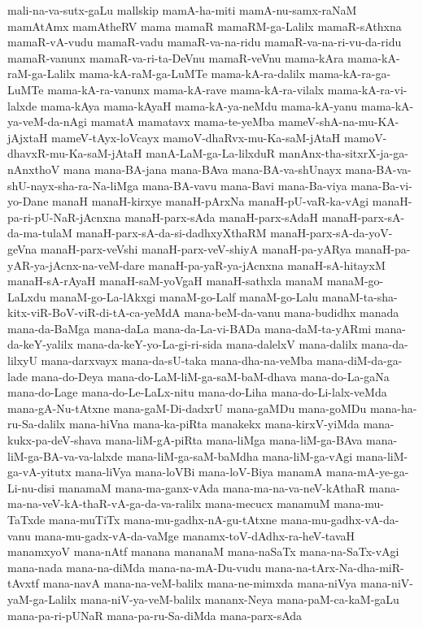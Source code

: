 {mali-na-va-sutx-gaLu
mallskip
mamA-ha-miti
mamA-nu-samx-raNaM
mamAtAmx
mamAtheRV
mama
mamaR
mamaRM-ga-Lalilx
mamaR-sAthxna
mamaR-vA-vudu
mamaR-vadu
mamaR-va-na-ridu
mamaR-va-na-ri-vu-da-ridu
mamaR-vanunx
mamaR-va-ri-ta-DeVnu
mamaR-veVnu
mama-kAra
mama-kA-raM-ga-Lalilx
mama-kA-raM-ga-LuMTe
mama-kA-ra-dalilx
mama-kA-ra-ga-LuMTe
mama-kA-ra-vanunx
mama-kA-rave
mama-kA-ra-vilalx
mama-kA-ra-vi-lalxde
mama-kAya
mama-kAyaH
mama-kA-ya-neMdu
mama-kA-yanu
mama-kA-ya-veM-da-nAgi
mamatA
mamatavx
mama-te-yeMba
mameV-shA-na-mu-KA-jAjxtaH
mameV-tAyx-loVcayx
mamoV-dhaRvx-mu-Ka-saM-jAtaH
mamoV-dhavxR-mu-Ka-saM-jAtaH
manA-LaM-ga-La-lilxduR
manAnx-tha-sitxrX-ja-ga-nAnxthoV
mana
mana-BA-jana
mana-BAva
mana-BA-va-shUnayx
mana-BA-va-shU-nayx-sha-ra-Na-liMga
mana-BA-vavu
mana-Bavi
mana-Ba-viya
mana-Ba-vi-yo-Dane
manaH
manaH-kirxye
manaH-pArxNa
manaH-pU-vaR-ka-vAgi
manaH-pa-ri-pU-NaR-jAcnxna
manaH-parx-sAda
manaH-parx-sAdaH
manaH-parx-sA-da-ma-tulaM
manaH-parx-sA-da-si-dadhxyXthaRM
manaH-parx-sA-da-yoV-geVna
manaH-parx-veVshi
manaH-parx-veV-shiyA
manaH-pa-yARya
manaH-pa-yAR-ya-jAcnx-na-veM-dare
manaH-pa-yaR-ya-jAcnxna
manaH-sA-hitayxM
manaH-sA-rAyaH
manaH-saM-yoVgaH
manaH-sathxla
manaM
manaM-go-LaLxdu
manaM-go-La-lAkxgi
manaM-go-Lalf
manaM-go-Lalu
manaM-ta-sha-kitx-viR-BoV-viR-di-tA-ca-yeMdA
mana-beM-da-vanu
mana-budidhx
manada
mana-da-BaMga
mana-daLa
mana-da-La-vi-BADa
mana-daM-ta-yARmi
mana-da-keY-yalilx
mana-da-keY-yo-La-gi-ri-sida
mana-dalelxV
mana-dalilx
mana-da-lilxyU
mana-darxvayx
mana-da-sU-taka
mana-dha-na-veMba
mana-diM-da-ga-lade
mana-do-Deya
mana-do-LaM-liM-ga-saM-baM-dhava
mana-do-La-gaNa
mana-do-Lage
mana-do-Le-LaLx-nitu
mana-do-Liha
mana-do-Li-lalx-veMda
mana-gA-Nu-tAtxne
mana-gaM-Di-dadxrU
mana-gaMDu
mana-goMDu
mana-ha-ru-Sa-dalilx
mana-hiVna
mana-ka-piRta
manakekx
mana-kirxV-yiMda
mana-kukx-pa-deV-shava
mana-liM-gA-piRta
mana-liMga
mana-liM-ga-BAva
mana-liM-ga-BA-va-va-lalxde
mana-liM-ga-saM-baMdha
mana-liM-ga-vAgi
mana-liM-ga-vA-yitutx
mana-liVya
mana-loVBi
mana-loV-Biya
manamA
mana-mA-ye-ga-Li-nu-disi
manamaM
mana-ma-ganx-vAda
mana-ma-na-va-neV-kAthaR
mana-ma-na-veV-kA-thaR-vA-ga-da-va-ralilx
mana-mecucx
manamuM
mana-mu-TaTxde
mana-muTiTx
mana-mu-gadhx-nA-gu-tAtxne
mana-mu-gadhx-vA-da-vanu
mana-mu-gadx-vA-da-vaMge
manamx-toV-dAdhx-ra-heV-tavaH
manamxyoV
mana-nAtf
manana
mananaM
mana-naSaTx
mana-na-SaTx-vAgi
mana-nada
mana-na-diMda
mana-na-mA-Du-vudu
mana-na-tArx-Na-dha-miR-tAvxtf
mana-navA
mana-na-veM-balilx
mana-ne-mimxda
mana-niVya
mana-niV-yaM-ga-Lalilx
mana-niV-ya-veM-balilx
mananx-Neya
mana-paM-ca-kaM-gaLu
mana-pa-ri-pUNaR
mana-pa-ru-Sa-diMda
mana-parx-sAda
}
